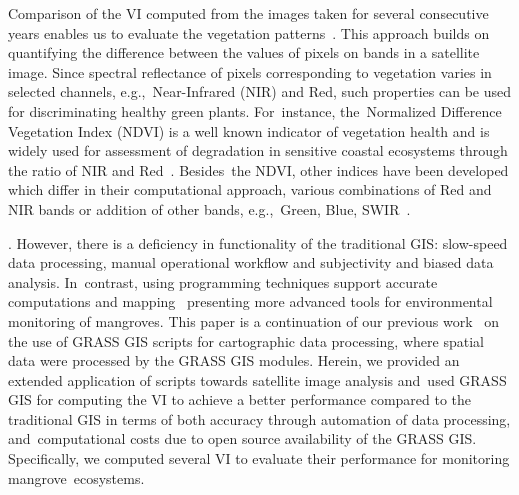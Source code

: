 \documentclass[jmse,article,accept,pdftex,moreauthors]{Definitions/mdpi}
\begin{document}
Comparison of the VI computed from the images taken for several consecutive years enables us to evaluate the vegetation patterns~\cite{OCHEGE2017211,Lemenkova202229}. This approach builds on quantifying the difference between the values of pixels on bands in a satellite image. Since spectral reflectance of pixels corresponding to vegetation varies in selected channels, e.g.,~Near-Infrared (NIR) and Red, such properties can be used for discriminating healthy green plants. For~instance, the~Normalized Difference Vegetation Index (NDVI) is a well known indicator of vegetation health and is widely used for assessment of degradation in sensitive coastal ecosystems through the ratio of NIR and Red~\cite{alademomi2020assessing,NSE2020e00599}. Besides~the NDVI, other indices have been developed which differ in their computational approach, various combinations of Red and NIR bands or addition of other bands, e.g.,~Green, Blue, SWIR~\cite{Adamu,rs10060897}. 

. However, there is a deficiency in functionality of the traditional GIS: slow-speed data processing, manual operational workflow and subjectivity and biased data analysis. In~contrast, using programming techniques support accurate computations and mapping~\cite{9883588,Lemenkova202227,9884244,Lemenkova202230,9964623} presenting more advanced tools for environmental monitoring of mangroves. This paper is a continuation of our previous work~\cite{technologies11020046} on the use of GRASS GIS scripts for cartographic data processing, where spatial data were processed by the GRASS GIS modules. Herein, we provided an extended application of scripts towards satellite image analysis and~used GRASS GIS for computing the VI to achieve a better performance compared to the traditional GIS in terms of both accuracy through automation of data processing, and~computational costs due to open source availability of the GRASS GIS. Specifically, we computed several VI to evaluate their performance for monitoring mangrove~ecosystems.
\end{document}
